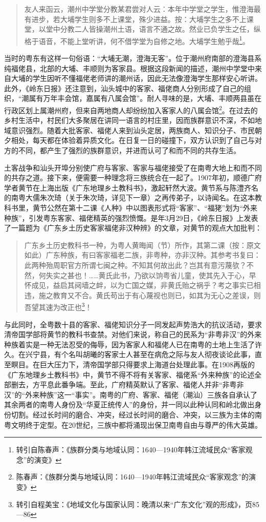 \begin{quote}
友人来函云，潮州中学堂分教某君尝对人云：本年中学堂之学生，惟澄海最有进步，若大埔学生则多不上课堂，殊少进益。按：大埔学生之多不上课堂，以堂中分教二人皆操潮州土语，语言不通之故。然业已负学生之任，纵格于语音，不能上堂听讲，何不借学堂为自修之地。大埔学生勉乎哉\footnote{转引自陈春声：《族群分类与地域认同：1640—1940年韩江流域民众“客家观念”的演变》}。
\end{quote}

当时的粤东有这样一句俗语：“大埔无潮，澄海无客”。位于潮州府南部的澄海县系纯福佬县，北部的大埔、丰顺则为客家县。根据这段新闻的描述，潮州中学堂中来自大埔的学生因听不懂福佬老师讲的潮州话，因此无法像澄海学生那样安心听讲。此外，《岭东日报》还注意到，汕头城中的客家、福佬商人分别形成了自己的组织，“潮属有万年丰会馆，嘉属有八属会馆”。耐人寻味的是，大埔、丰顺两县虽在行政区划上属潮州府，但来自两地商人却纷纷加入客家人的八属会馆\footnote{陈春声：《族群分类与地域认同：1640—1940年韩江流域民众“客家观念”的演变》}。在过去的乡村生活中，村民们大多聚居在讲同一语言的村庄里，因而族群意识不深，不如地域意识强烈。随着大批客家、福佬人来到汕头定居，两族商人、知识分子、市民朝夕相处，每天都在体验着异质文化。在日复一日的碰撞下，双方认识到了自己与对方的不同，都产生了强烈的族群意识，并进而认可了和而不同的共存生活。

土客战争和汕头开埠分别使广府与客家、客家与福佬接受了在南粤大地上和而不同的共存之道。接下来，便需要一种理念将三族统合在一起了。1907年初，顺德广府学者黄节在上海出版《广东地理乡土教科书》，激起轩然大波。黄节系与陈澧齐名的南粤大儒朱次琦（关于朱次琦，详见下一章）之再传弟子，以诗闻名。在这本教科书里，黄节公然在第十二课《人种》中以图表形式将“客家”、“福狫”划为“外来种族”，引发粤东客家、福佬精英的强烈愤慨。是年3月29日，《岭东日报》上发表了一篇题为《广东乡土历史客家福佬非汉种辨》的文章，对黄节的观点大加批判：

\begin{quote}
广东乡土历史教科书一种，为粤人黄晦闻（节）所作，其第二课（按：原文如此）广东种族，有曰客家福老二族，非粤种，亦非汉种。其参考书复曰：此两种殆周职官方所谓七闽之种。不知其何故出此？岂其有意污蔑欤？不然，何失实之甚也！……黄氏此书，乃欲以饷粤省儿童，使其先入于心，早怀成见，益启其阋墙之衅，以为亡国之媒，非黄氏贻之祸乎？考之事实已相违，施之教育又不合。黄氏苟出于有心蔑视也则已，如其为无心之差误，则吾望其速为改正也\footnote{转引自程美宝：《地域文化与国家认同：晚清以来“广东文化”观的形成》，页85—86}！
\end{quote}

与此同时，全粤数十县的客家、福佬知识分子一同发起声势浩大的抗议活动，要求清帝国学部将黄节的教科书查禁。对他们来说，称自己的民系为“非粤非汉”的外来种族着实是一种无法忍受的侮辱，因为客家人和福佬人已在南粤的土地上生活了许久。在兴宁县，有个名叫胡曦的客家士人甚至在病危之际与友人彻夜谈论此事，直至瞑目。在巨大压力下，清帝国学部只得要求上海道台处理此事。在1908再版的《广东地理乡土教科书》中，黄节不得不将有关客家、福佬系“外来种族”的论述全部删去，方平息此番争端。至此，广府精英默认了客家、福佬人并非“非粤非汉”的“外来种族”这一“事实”。南粤的广府、客家、福佬（潮汕）三族各自承认了其余两者的南粤人身份及“华夏正统传人”的身份，并一同以此种认同和岭北做出身份切割。经过长时间的磨合、冲突，经过长时间的磨合、冲突，以三族为主体的南粤文明终于定型。在20世纪，三族中都将涌现出保卫南粤自由与尊严的伟大英雄。

